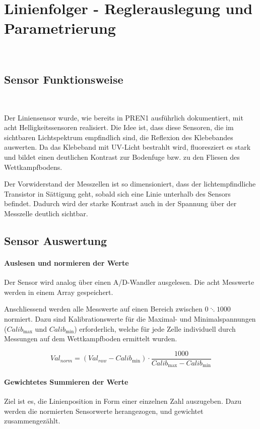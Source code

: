 \documentclass[main.tex]{subfiles} %
\begin{document}

\section{Linienfolger - Reglerauslegung und Parametrierung}~\label{apdx:LineFollowerRegler}

\subsection*{Sensor Funktionsweise}~\label{apdx:Liniensensor_auswertung}

Der Liniensensor wurde, wie bereits in PREN1 ausführlich dokumentiert, mit acht
Helligkeitssensoren realisiert. Die Idee ist, dass diese Sensoren, die im
sichtbaren Lichtspektrum empfindlich sind, die Reflexion des Klebebandes
auswerten. Da das Klebeband mit UV-Licht bestrahlt wird, fluoresziert es stark
und bildet einen deutlichen Kontrast zur Bodenfuge bzw. zu den Fliesen des
Wettkampfbodens.


Der Vorwiderstand der Messzellen ist so dimensioniert, dass der
lichtempfindliche Transistor in Sättigung geht, sobald sich eine Linie
unterhalb des Sensors befindet. Dadurch wird der starke Kontrast auch in der
Spannung über der Messzelle deutlich sichtbar.

\subsection*{Sensor Auswertung}

\paragraph{Auslesen und normieren der Werte}

Der Sensor wird analog über einen A/D-Wandler ausgelesen. Die acht Messwerte
werden in einem Array gespeichert.

Anschliessend werden alle Messwerte auf einen Bereich zwischen $0 \ddots 1000$
normiert. Dazu sind Kalibrationswerte für die Maximal- und Minimalspannungen
($Calib_{\max}$ und $Calib_{\min}$) erforderlich, welche für jede Zelle
individuell durch Messungen auf dem Wettkampfboden ermittelt wurden.

\[
    Val_{norm} = (Val_{raw} - Calib_{\min}) \cdot \frac{1000}{Calib_{\max} - Calib_{\min}}
\]

\paragraph{Gewichtetes Summieren der Werte}
Ziel ist es, die Linienposition in Form einer einzelnen Zahl auszugeben. Dazu
werden die normierten Sensorwerte herangezogen, und gewichtet zusammengezählt.
\end{document}

